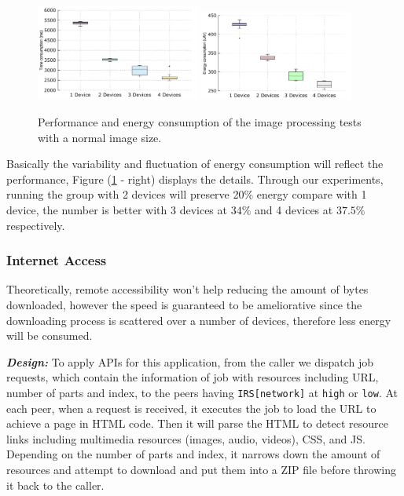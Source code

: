 \documentclass{sig-alternate}[10pt]
\begin{document}
\begin{figure}
	\centering
		\includegraphics[width=0.48\textwidth]{data/img_small_perf_full.pdf}
		\includegraphics[width=0.45\textwidth]{data/img_small_energy.pdf}
	\caption{Performance and energy consumption of the image processing tests with a normal image size.}
	\label{fig:small_img_perf}
\end{figure}

Basically the variability and fluctuation of energy consumption will reflect the performance, Figure (\ref{fig:small_img_perf} - right) displays the details. Through our experiments, running the group with 2 devices will preserve 20\% energy compare with 1 device, the number is better with 3 devices at $34\%$ and 4 devices at $37.5\%$ respectively.


\subsubsection{Internet Access} 
Theoretically, remote accessibility won't help reducing the amount of bytes downloaded, however the speed is guaranteed to be ameliorative since the downloading process is scattered over a number of devices, therefore less energy will be consumed. 

\textbf{\emph{Design:}}
To apply APIs for this application, from the caller we dispatch job requests, which contain the information of job with resources including URL, number of parts and index, to the peers having \texttt{IRS[network]} at \texttt{high} or \texttt{low}. At each peer, when a request is received, it executes the job to load the URL to achieve a page in HTML code. Then it will parse the HTML to detect resource links including multimedia resources (images, audio, videos), CSS, and JS. Depending on the number of parts and index, it narrows down the amount of resources and attempt to download and put them into a ZIP file before throwing it back to the caller.
\end{document}
